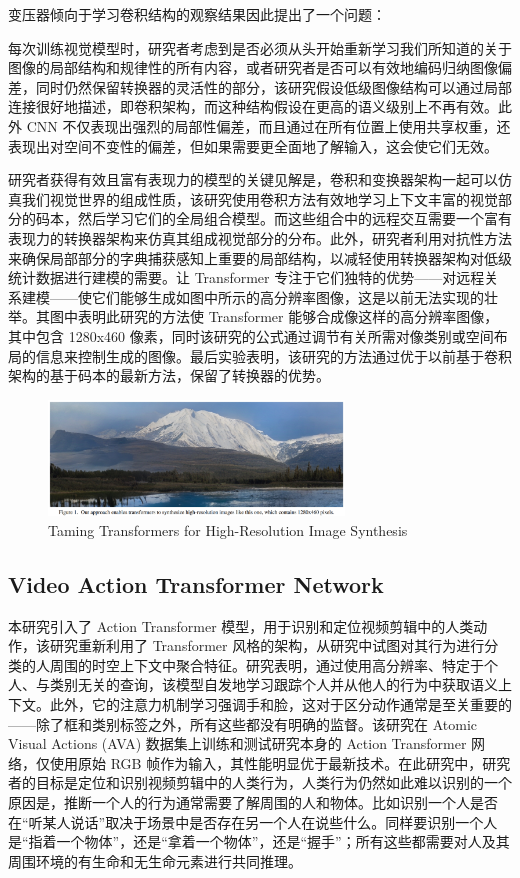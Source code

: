 变压器倾向于学习卷积结构的观察结果因此提出了一个问题：

每次训练视觉模型时，研究者考虑到是否必须从头开始重新学习我们所知道的关于图像的局部结构和规律性的所有内容，或者研究者是否可以有效地编码归纳图像偏差，同时仍然保留转换器的灵活性的部分，该研究假设低级图像结构可以通过局部连接很好地描述，即卷积架构，而这种结构假设在更高的语义级别上不再有效。此外 CNN 不仅表现出强烈的局部性偏差，而且通过在所有位置上使用共享权重，还表现出对空间不变性的偏差，但如果需要更全面地了解输入，这会使它们无效。

研究者获得有效且富有表现力的模型的关键见解是，卷积和变换器架构一起可以仿真我们视觉世界的组成性质，该研究使用卷积方法有效地学习上下文丰富的视觉部分的码本，然后学习它们的全局组合模型。而这些组合中的远程交互需要一个富有表现力的转换器架构来仿真其组成视觉部分的分布。此外，研究者利用对抗性方法来确保局部部分的字典捕获感知上重要的局部结构，以减轻使用转换器架构对低级统计数据进行建模的需要。让 Transformer 专注于它们独特的优势——对远程关系建模——使它们能够生成如图中所示的高分辨率图像，这是以前无法实现的壮举。其图中表明此研究的方法使 Transformer 能够合成像这样的高分辨率图像，其中包含 1280x460 像素，同时该研究的公式通过调节有关所需对像类别或空间布局的信息来控制生成的图像。最后实验表明，该研究的方法通过优于以前基于卷积架构的基于码本的最新方法，保留了转换器的优势。

\begin{figure}[htb]
\centering 
\includegraphics[width=0.7\textwidth]{img/pa5.png} 
\caption{Taming Transformers for High-Resolution Image Synthesis}
\label{Test}
\end{figure}

\subsection{Video Action Transformer Network}

本研究引入了 Action Transformer 模型，用于识别和定位视频剪辑中的人类动作，该研究重新利用了 Transformer 风格的架构，从研究中试图对其行为进行分类的人周围的时空上下文中聚合特征。研究表明，通过使用高分辨率、特定于个人、与类别无关的查询，该模型自发地学习跟踪个人并从他人的行为中获取语义上下文。此外，它的注意力机制学习强调手和脸，这对于区分动作通常是至关重要的——除了框和类别标签之外，所有这些都没有明确的监督。该研究在 Atomic Visual Actions (AVA) 数据集上训练和测试研究本身的 Action Transformer 网络，仅使用原始 RGB 帧作为输入，其性能明显优于最新技术。在此研究中，研究者的目标是定位和识别视频剪辑中的人类行为，人类行为仍然如此难以识别的一个原因是，推断一个人的行为通常需要了解周围的人和物体。比如识别一个人是否在“听某人说话”取决于场景中是否存在另一个人在说些什么。同样要识别一个人是“指着一个物体”，还是“拿着一个物体”，还是“握手”；所有这些都需要对人及其周围环境的有生命和无生命元素进行共同推理。

